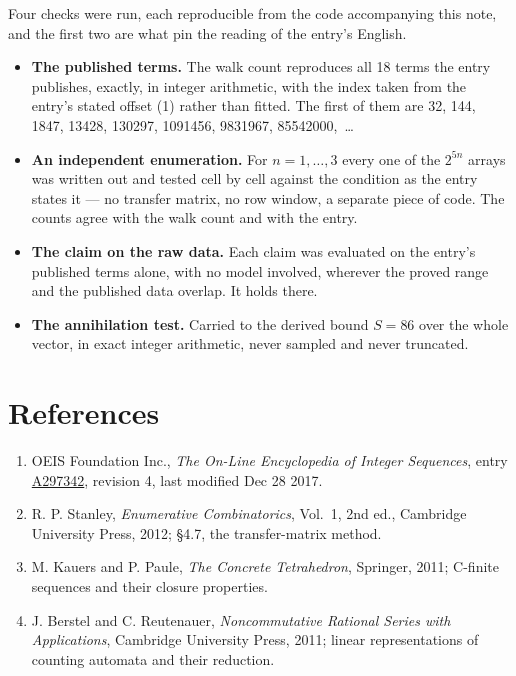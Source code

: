 \documentclass[11pt]{article}
\theoremstyle{definition}
\begin{document}
Four checks were run, each reproducible from the code accompanying this note, and the first two are what pin the reading of the entry's English.

\begin{itemize}

\item {\bfseries The published terms.} The walk count reproduces all 18 terms the entry publishes, exactly, in integer arithmetic, with the index taken from the entry's stated offset (1) rather than fitted. The first of them are 32, 144, 1847, 13428, 130297, 1091456, 9831967, 85542000,~\dots

\item {\bfseries An independent enumeration.} For $n = 1,\dots,3$ every one of the $2^{5n}$ arrays was written out and tested cell by cell against the condition as the entry states it --- no transfer matrix, no row window, a separate piece of code. The counts agree with the walk count and with the entry.

\item {\bfseries The claim on the raw data.} Each claim was evaluated on the entry's published terms alone, with no model involved, wherever the proved range and the published data overlap. It holds there.

\item {\bfseries The annihilation test.} Carried to the derived bound $S = 86$ over the whole vector, in exact integer arithmetic, never sampled and never truncated.

\end{itemize}

\section{References}

\begin{enumerate}

\item OEIS Foundation Inc., \emph{The On-Line Encyclopedia of Integer Sequences}, entry \href{https://oeis.org/A297342}{A297342}, revision 4, last modified Dec 28 2017.

\item R. P. Stanley, \emph{Enumerative Combinatorics}, Vol.~1, 2nd ed., Cambridge University Press, 2012; \S4.7, the transfer-matrix method.

\item M. Kauers and P. Paule, \emph{The Concrete Tetrahedron}, Springer, 2011; C-finite sequences and their closure properties.

\item J. Berstel and C. Reutenauer, \emph{Noncommutative Rational Series with Applications}, Cambridge University Press, 2011; linear representations of counting automata and their reduction.

\end{enumerate}
\end{document}
